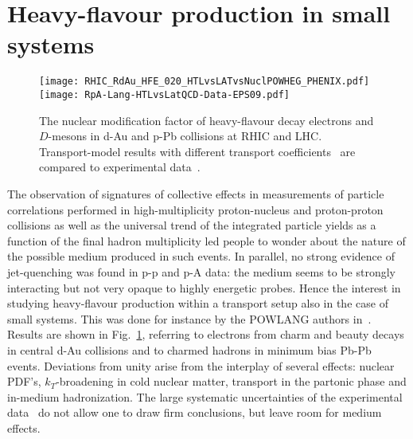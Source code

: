 \documentclass{PoS}
\begin{document}
\section{Heavy-flavour production in small systems}
\begin{figure}[!ht]
\begin{center}
\texttt{[image: RHIC\_RdAu\_HFE\_020\_HTLvsLATvsNuclPOWHEG\_PHENIX.pdf]}
\texttt{[image: RpA-Lang-HTLvsLatQCD-Data-EPS09.pdf]}
\caption{The nuclear modification factor of heavy-flavour decay electrons and $D$-mesons in d-Au and p-Pb collisions at RHIC and LHC. Transport-model results with different transport coefficients~\cite{Beraudo:2015wsd} are compared to experimental data~\cite{Adare:2012yxa,Abelev:2014hha}.}\label{fig:small} 
\end{center}
\end{figure}
The observation of signatures of collective effects in measurements of particle correlations performed in high-multiplicity proton-nucleus and proton-proton collisions as well as the universal trend of the integrated particle yields as a function of the final hadron multiplicity led people to wonder about the nature of the possible medium produced in such events. In parallel, no strong evidence of jet-quenching was found in p-p and p-A data: the medium seems to be strongly interacting but not very opaque to highly energetic probes. Hence the interest in studying heavy-flavour production within a transport setup also in the case of small systems. This was done for instance by the POWLANG authors in~\cite{Beraudo:2015wsd}. Results are shown in Fig.~\ref{fig:small}, referring to electrons from charm and beauty decays in central d-Au collisions and to charmed hadrons in minimum bias Pb-Pb events. Deviations from unity arise from the interplay of several effects: nuclear PDF's, $k_T$-broadening in cold nuclear matter, transport in the partonic phase and in-medium hadronization. The large systematic uncertainties of the experimental data~\cite{Adare:2012yxa,Abelev:2014hha} do not allow one to draw firm conclusions, but leave room for medium effects. 




\end{document}
